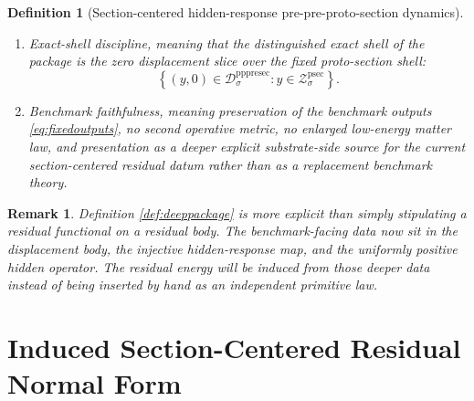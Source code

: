 \documentclass[11pt]{article}
\newcommand{\ProtoSectionBody}[1]{\mathcal B_{#1}^{\mathrm{psec}}}
\newcommand{\ProtoSectionShell}[1]{\mathcal Z_{#1}^{\mathrm{psec}}}
\newcommand{\PrePreProtoSectionResidualBody}[1]{\mathcal D_{#1}^{\mathrm{pppresec}}}
\newcommand{\PrePreProtoSectionHidden}[1]{H_{#1}^{\mathrm{pppresec}}}
\newcommand{\PrePreProtoSectionOperator}[1]{K_{#1}^{\mathrm{pppresec}}}
\newtheorem{definition}{Definition}
\newtheorem{remark}{Remark}
\begin{document}
\begin{definition}[Section-centered hidden-response pre-pre-proto-section dynamics]
\begin{enumerate}
\[    \]
    satisfying the uniform coercive bound
    \begin{equation}
    \ev{\eta,\PrePreProtoSectionOperator{\sigma}(y)\eta}
    \ge
    \mu_{\sigma}\,\|\eta\|^{2}
    \qquad
    \text{for all }
    y\in\ProtoSectionBody{\sigma},
    \ \eta\in\PrePreProtoSectionHidden{\sigma}
    \label{eq:gap}
    \end{equation}
    for some constant \(\mu_{\sigma}>0\).
    \item Exact-shell discipline, meaning that the distinguished exact shell of the package is the zero displacement slice over the fixed proto-section shell:
    \[
    \left\{
    (y,0)\in\PrePreProtoSectionResidualBody{\sigma}:y\in\ProtoSectionShell{\sigma}
    \right\}.
    \]
    \item Benchmark faithfulness, meaning preservation of the benchmark outputs \eqref{eq:fixedoutputs}, no second operative metric, no enlarged low-energy matter law, and presentation as a deeper explicit substrate-side source for the current section-centered residual datum rather than as a replacement benchmark theory.
\end{enumerate}
\end{definition}

\begin{remark}
Definition \ref{def:deeppackage} is more explicit than simply stipulating a residual functional on a residual body. The benchmark-facing data now sit in the displacement body, the injective hidden-response map, and the uniformly positive hidden operator. The residual energy will be induced from those deeper data instead of being inserted by hand as an independent primitive law.
\end{remark}

\section{Induced Section-Centered Residual Normal Form}
\end{document}
